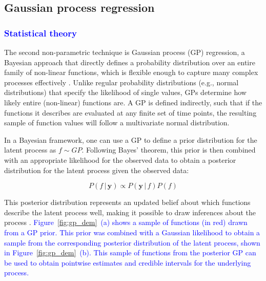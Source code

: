 \documentclass[man, floatsintext]{apa7}
\begin{document}
\subsection{Gaussian process regression}

\subsubsection{\textcolor{blue}{Statistical theory}}

The second non-parametric technique is Gaussian process (GP) regression, a
Bayesian approach that directly defines a probability distribution over an
entire family of non-linear functions, which is flexible enough to capture many
complex processes effectively \parencite{rasmussen_gaussian_2006,
  betancourt_robust_2020, roberts_gaussian_2013}. Unlike regular probability
distributions (e.g., normal distributions) that specify the likelihood of
single values, GPs determine how likely entire (non-linear) functions are. A GP
is defined indirectly, such that if the functions it describes are evaluated at
any finite set of time points, the resulting sample of function values will
follow a multivariate normal distribution.

In a Bayesian framework, one can use
a GP to define a prior distribution for the latent process as $f \sim GP$.
Following Bayes' theorem, this prior is then combined with an appropriate
likelihood for the observed data to obtain a posterior distribution for the
latent process given the observed data:

\begin{equation}
  P(f \, | \, \textbf{y})  \propto P(\textbf{y} \, | \, f) P(f)
\end{equation}

\noindent This posterior distribution represents an updated belief about which
functions describe the latent process well, making it possible to draw
inferences about the process \parencite{rasmussen_gaussian_2006}.
\textcolor{blue}{
  Figure~\ref{fig:gp_dem}~(a) shows a sample of functions (in red) drawn from a
  GP prior. This prior was combined with a Gaussian likelihood to obtain a
  sample
  from the corresponding posterior distribution of the latent process, shown in
  Figure~\ref{fig:gp_dem}~(b). This sample of functions from the posterior GP
  can
  be used to obtain pointwise estimates and credible intervals for the
  underlying
  process.
}
\end{document}
